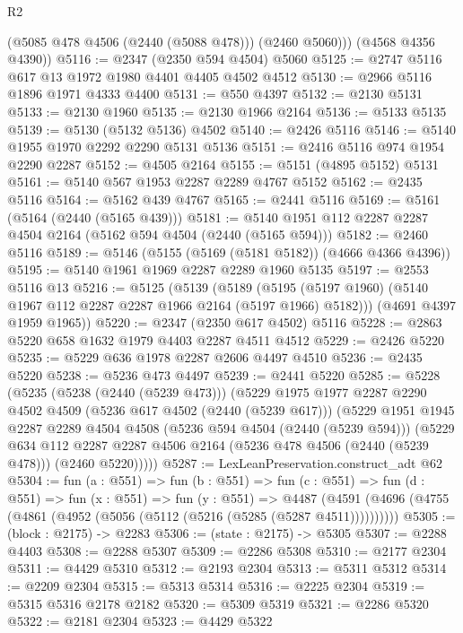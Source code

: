 \begin{lexlean}{R2}
\begin{coremodule}
          (@5085 @478 @4506 (@2440 (@5088 @478)))
          (@2460 @5060)))
      (@4568 @4356 @4390))
@5116 := @2347 (@2350 @594 @4504) @5060
@5125 := @2747 @5116 @617 @13 @1972 @1980 @4401 @4405 @4502 @4512
@5130 := @2966 @5116 @1896 @1971 @4333 @4400
@5131 := @550 @4397
@5132 := @2130 @5131
@5133 := @2130 @1960
@5135 := @2130 @1966 @2164
@5136 := @5133 @5135
@5139 := @5130 (@5132 @5136) @4502
@5140 := @2426 @5116
@5146 := @5140 @1955 @1970 @2292 @2290 @5131 @5136
@5151 := @2416 @5116 @974 @1954 @2290 @2287
@5152 := @4505 @2164
@5155 := @5151 (@4895 @5152) @5131
@5161 := @5140 @567 @1953 @2287 @2289 @4767 @5152
@5162 := @2435 @5116
@5164 := @5162 @439 @4767
@5165 := @2441 @5116
@5169 := @5161 (@5164 (@2440 (@5165 @439)))
@5181 := @5140 @1951 @112 @2287 @2287 @4504 @2164 (@5162 @594 @4504 (@2440 (@5165 @594)))
@5182 := @2460 @5116
@5189 := @5146 (@5155 (@5169 (@5181 @5182)) (@4666 @4366 @4396))
@5195 := @5140 @1961 @1969 @2287 @2289 @1960 @5135
@5197 := @2553 @5116 @13
@5216 := @5125
    (@5139
      (@5189 (@5195 (@5197 @1960) (@5140 @1967 @112 @2287 @2287 @1966 @2164 (@5197 @1966) @5182)))
      (@4691 @4397 @1959 @1965))
@5220 := @2347 (@2350 @617 @4502) @5116
@5228 := @2863 @5220 @658 @1632 @1979 @4403 @2287 @4511 @4512
@5229 := @2426 @5220
@5235 := @5229 @636 @1978 @2287 @2606 @4497 @4510
@5236 := @2435 @5220
@5238 := @5236 @473 @4497
@5239 := @2441 @5220
@5285 := @5228
    (@5235
      (@5238 (@2440 (@5239 @473)))
      (@5229
        @1975
        @1977
        @2287
        @2290
        @4502
        @4509
        (@5236 @617 @4502 (@2440 (@5239 @617)))
        (@5229
          @1951
          @1945
          @2287
          @2289
          @4504
          @4508
          (@5236 @594 @4504 (@2440 (@5239 @594)))
          (@5229
            @634
            @112
            @2287
            @2287
            @4506
            @2164
            (@5236 @478 @4506 (@2440 (@5239 @478)))
            (@2460 @5220)))))
@5287 := LexLeanPreservation.construct_adt @62
@5304 := fun (a : @551) =>
  fun (b : @551) =>
  fun (c : @551) =>
  fun (d : @551) =>
  fun (x : @551) =>
  fun (y : @551) =>
  @4487 (@4591 (@4696 (@4755 (@4861 (@4952 (@5056 (@5112 (@5216 (@5285 (@5287 @4511))))))))))
@5305 := (block : @2175) -> @2283
@5306 := (state : @2175) -> @5305
@5307 := @2288 @4403
@5308 := @2288 @5307
@5309 := @2286 @5308
@5310 := @2177 @2304
@5311 := @4429 @5310
@5312 := @2193 @2304
@5313 := @5311 @5312
@5314 := @2209 @2304
@5315 := @5313 @5314
@5316 := @2225 @2304
@5319 := @5315 @5316 @2178 @2182
@5320 := @5309 @5319
@5321 := @2286 @5320
@5322 := @2181 @2304
@5323 := @4429 @5322

\end{coremodule}
\end{lexlean}
